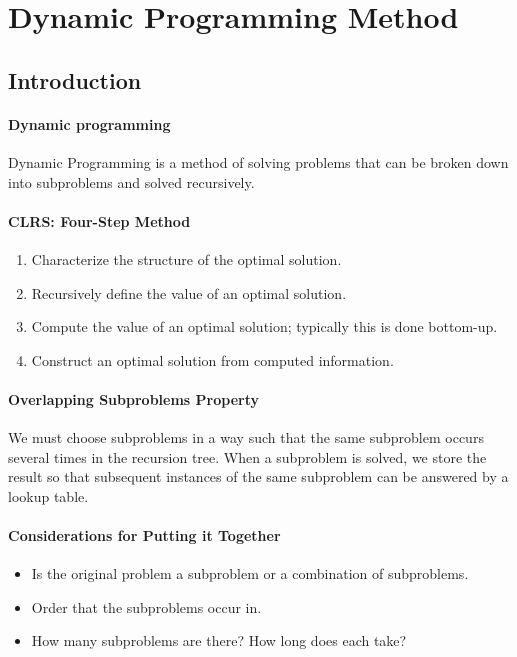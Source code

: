 \section{Dynamic Programming Method}

\subsection{Introduction}
\paragraph{Dynamic programming}
Dynamic Programming is a method of solving problems that can be broken down
into subproblems and solved recursively.

\paragraph{CLRS: Four-Step Method}
\begin{enumerate}
  \item Characterize the structure of the optimal solution.
  \item Recursively define the value of an optimal solution.
  \item Compute the value of an optimal solution; typically this is done bottom-up.
  \item Construct an optimal solution from computed information.
\end{enumerate}

\paragraph{Overlapping Subproblems Property}
We must choose subproblems in a way such that the same subproblem
occurs several times in the recursion tree.
When a subproblem is solved, we store the result so that
subsequent instances of the same subproblem can be answered by a lookup table.

\paragraph{Considerations for Putting it Together}
\begin{itemize}
  \item Is the original problem a subproblem or a combination of subproblems.
  \item Order that the subproblems occur in.
  \item How many subproblems are there? How long does each take?
\end{itemize}

